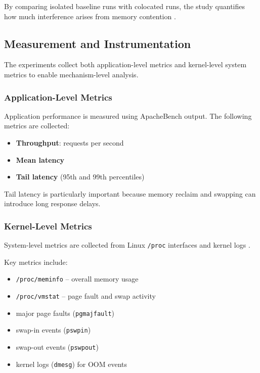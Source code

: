 \documentclass[conference]{IEEEtran}
\begin{document}
By comparing isolated baseline runs with colocated runs, the study quantifies how much interference arises from memory contention \cite{mars2011bubble}.

\subsection{Measurement and Instrumentation}

The experiments collect both application-level metrics and kernel-level system metrics to enable mechanism-level analysis.

\subsubsection{Application-Level Metrics}

Application performance is measured using ApacheBench output. The following metrics are collected:

\begin{itemize}
\item \textbf{Throughput}: requests per second
\item \textbf{Mean latency}
\item \textbf{Tail latency} (95th and 99th percentiles)
\end{itemize}

Tail latency is particularly important because memory reclaim and swapping can introduce long response delays.

\subsubsection{Kernel-Level Metrics}

System-level metrics are collected from Linux \texttt{/proc} interfaces and kernel logs \cite{linux_vm_sysctl}.

Key metrics include:

\begin{itemize}
\item \texttt{/proc/meminfo} -- overall memory usage
\item \texttt{/proc/vmstat} -- page fault and swap activity
\item major page faults (\texttt{pgmajfault})
\item swap-in events (\texttt{pswpin})
\item swap-out events (\texttt{pswpout})
\item kernel logs (\texttt{dmesg}) for OOM events
\end{itemize}
\end{document}
